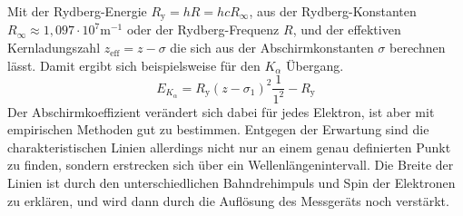 Mit der Rydberg-Energie $R_{\text{y}} = hR = hcR_{\infty}$, aus der Rydberg-Konstanten $R_{\infty} ≈ 1,097 \cdot 10^{7} \text{m}^{-1}$  oder der Rydberg-Frequenz $R$, und der effektiven Kernladungszahl $z_{\text{eff}} = z-\sigma$ die sich aus der Abschirmkonstanten $\sigma$ berechnen lässt.
Damit ergibt sich beispielsweise für den $K_{\alpha}$ Übergang.
\begin{equation*}
    E_{K_{\alpha}}= R_{\text{y}}(z-\sigma_1)^2 \frac{1}{1^2} - R_{\text{y}}
\end{equation*}
Der Abschirmkoeffizient verändert sich dabei für jedes Elektron, ist aber mit empirischen Methoden gut zu bestimmen.
Entgegen der Erwartung sind die charakteristischen Linien allerdings nicht nur an einem genau definierten Punkt zu finden, sondern erstrecken sich über ein Wellenlängenintervall.
Die Breite der Linien ist durch den unterschiedlichen Bahndrehimpuls und Spin der Elektronen zu erklären, und wird dann durch die Auflösung des Messgeräts noch verstärkt.


